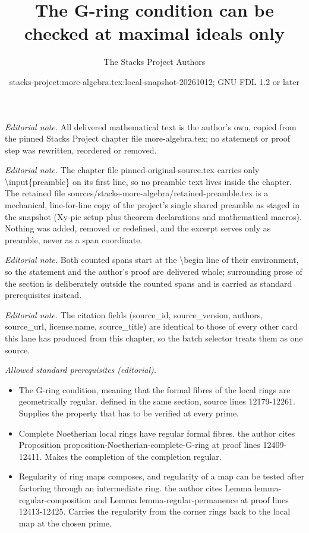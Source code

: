 \documentclass[10pt,a4paper]{amsart}
\title{The G-ring condition can be checked at maximal ideals only}
\author{The Stacks Project Authors}
\date{stacks-project:more-algebra.tex:local-snapshot-20261012; GNU FDL 1.2 or later}
\theoremstyle{plain}
\theoremstyle{definition}
\theoremstyle{remark}
\numberwithin{equation}{subsection}
\begin{document}
\maketitle
\setcounter{subsection}{1}
\noindent\textit{Editorial note.} All delivered mathematical text is the author's own, copied from the pinned Stacks Project chapter file more-algebra.tex; no statement or proof step was rewritten, reordered or removed.\par\medskip
\noindent\textit{Editorial note.} The chapter file pinned-original-source.tex carries only \textbackslash{}input\{preamble\} on its first line, so no preamble text lives inside the chapter. The retained file sources/stacks-more-algebra/retained-preamble.tex is a mechanical, line-for-line copy of the project's single shared preamble as staged in the snapshot (Xy-pic setup plus theorem declarations and mathematical macros). Nothing was added, removed or redefined, and the excerpt serves only as preamble, never as a span coordinate.\par\medskip
\noindent\textit{Editorial note.} Both counted spans start at the \textbackslash{}begin line of their environment, so the statement and the author's proof are delivered whole; surrounding prose of the section is deliberately outside the counted spans and is carried as standard prerequisites instead.\par\medskip
\noindent\textit{Editorial note.} The citation fields (source\_id, source\_version, authors, source\_url, license.name, source\_title) are identical to those of every other card this lane has produced from this chapter, so the batch selector treats them as one source.\par\medskip
\noindent\textit{Allowed standard prerequisites (editorial).}\begin{itemize}
\item The G-ring condition, meaning that the formal fibres of the local rings are geometrically regular. defined in the same section, source lines 12179-12261. Supplies the property that has to be verified at every prime.
\item Complete Noetherian local rings have regular formal fibres. the author cites Proposition proposition-Noetherian-complete-G-ring at proof lines 12409-12411. Makes the completion of the completion regular.
\item Regularity of ring maps composes, and regularity of a map can be tested after factoring through an intermediate ring. the author cites Lemma lemma-regular-composition and Lemma lemma-regular-permanence at proof lines 12413-12425. Carries the regularity from the corner rings back to the local map at the chosen prime.
\end{itemize}\medskip
\end{document}
